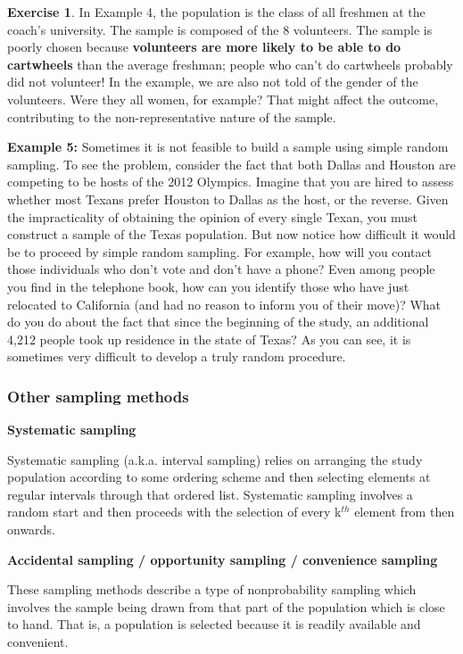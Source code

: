 \documentclass[
  12pt,
  oneside]{book}
\theoremstyle{definition}
\theoremstyle{definition}
\theoremstyle{definition}
\newtheorem{exercise}{Exercise}[chapter]
\theoremstyle{definition}
\theoremstyle{remark}
\begin{document}
\begin{exercise}
In Example 4, the population is the class of all freshmen at the coach's university.
The sample is composed of the 8 volunteers. The sample is poorly chosen because
\textbf{volunteers are more likely to be able to do cartwheels} than the average freshman;
people who can't do cartwheels probably did not volunteer! In the example, we are
also not told of the gender of the volunteers. Were they all women, for example?
That might affect the outcome, contributing to the non-representative nature of the
sample.

\textbf{Example 5:}
Sometimes it is not feasible to build a sample using simple random sampling. To
see the problem, consider the fact that both Dallas and Houston are competing to
be hosts of the 2012 Olympics. Imagine that you are hired to assess whether most
Texans prefer Houston to Dallas as the host, or the reverse. Given the
impracticality of obtaining the opinion of every single Texan, you must construct a
sample of the Texas population. But now notice how difficult it would be to
proceed by simple random sampling. For example, how will you contact those
individuals who don't vote and don't have a phone? Even among people you find
in the telephone book, how can you identify those who have just relocated to
California (and had no reason to inform you of their move)? What do you do about
the fact that since the beginning of the study, an additional 4,212 people took up
residence in the state of Texas? As you can see, it is sometimes very difficult to
develop a truly random procedure.
\end{exercise}

\hypertarget{other-sampling-methods}{%
\subsubsection{Other sampling methods}\label{other-sampling-methods}}

\textbf{Systematic sampling}

Systematic sampling (a.k.a. interval sampling) relies on arranging the study population according to some ordering scheme and then selecting elements at regular intervals through that ordered list. Systematic sampling involves a random start and then proceeds with the selection of every k\(^{th}\) element from then onwards.

\textbf{Accidental sampling / opportunity sampling / convenience sampling}

These sampling methods describe a type of nonprobability sampling which involves the sample being drawn from that part of the population which is close to hand. That is, a population is selected because it is readily available and convenient.
\end{document}

